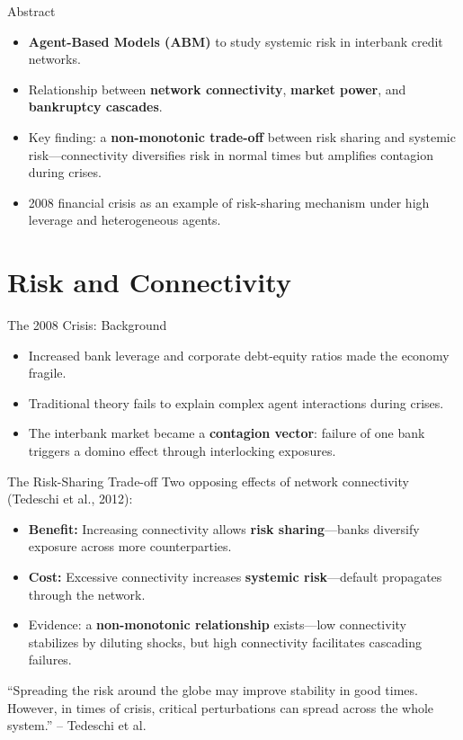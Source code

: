 \begin{frame}{Abstract}
  \begin{itemize}
    \item \textbf{Agent-Based Models (ABM)} to study systemic risk in interbank credit networks.
    \item Relationship between \textbf{network connectivity}, \textbf{market power}, and \textbf{bankruptcy cascades}.    
    \item Key finding: a \textbf{non-monotonic trade-off} between risk sharing and systemic risk---connectivity diversifies risk in normal times but amplifies contagion during crises.
    \item 2008 financial crisis as an example of risk-sharing mechanism under high leverage and heterogeneous agents.
  \end{itemize}
\end{frame}

\section{Risk and Connectivity}\label{sec:2}

\begin{frame}{The 2008 Crisis: Background}
  \begin{itemize}
    \item Increased bank leverage and corporate debt-equity ratios made the economy fragile.
    \item Traditional theory fails to explain complex agent interactions during crises.
    \item The interbank market became a \textbf{contagion vector}: failure of one bank triggers a domino effect through interlocking exposures.
  \end{itemize}
\end{frame}

\begin{frame}{The Risk-Sharing Trade-off}
  Two opposing effects of network connectivity (Tedeschi et al., 2012):
  \begin{itemize}
    \item \textbf{Benefit:} Increasing connectivity allows \textbf{risk sharing}---banks diversify exposure across more counterparties.
    \item \textbf{Cost:} Excessive connectivity increases \textbf{systemic risk}---default propagates through the network.
    \item Evidence: a \textbf{non-monotonic relationship} exists---low connectivity stabilizes by diluting shocks, but high connectivity facilitates cascading failures.
  \end{itemize}
  \vspace{0.3cm}
  ``Spreading the risk around the globe may improve stability in good times. However, in times of crisis, critical perturbations can spread across the whole system.'' -- Tedeschi et al.
\end{frame}

